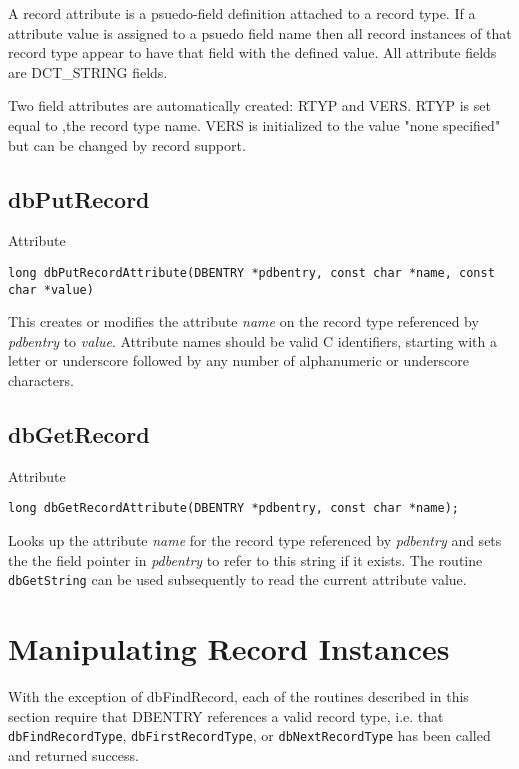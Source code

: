 A record attribute is a psuedo-field definition attached to a record type. If a attribute value is assigned to a psuedo field 
name then all record instances of that record type appear to have that field with the defined value. All attribute fields are 
DCT\_STRING fields.

Two field attributes are automatically created: RTYP and VERS. RTYP is set equal to ,the record type name. VERS is 
initialized to the value "none specified" but can be changed by record support.

\subsection{dbPutRecord}

Attribute

\begin{verbatim}long dbPutRecordAttribute(DBENTRY *pdbentry, const char *name, const char *value)
\end{verbatim}This creates or modifies the attribute \emph{name} on the record type referenced by \emph{pdbentry} to \emph{value}. Attribute names should be 
valid C identifiers, starting with a letter or underscore followed by any number of alphanumeric or underscore characters.

\subsection{dbGetRecord}

Attribute

\begin{verbatim}long dbGetRecordAttribute(DBENTRY *pdbentry, const char *name);
\end{verbatim}Looks up the attribute \emph{name} for the record type referenced by \emph{pdbentry} and sets the the field pointer in \emph{pdbentry} to refer to 
this string if it exists. The routine \verb|dbGetString| can be used subsequently to read the current attribute value.

\section{Manipulating Record Instances}

With the exception of dbFindRecord, each of the routines described in this section require that DBENTRY references a 
valid record type, i.e. that \verb|dbFindRecordType|, \verb|dbFirstRecordType|, or \verb|dbNextRecordType| has been called 
and returned success.

